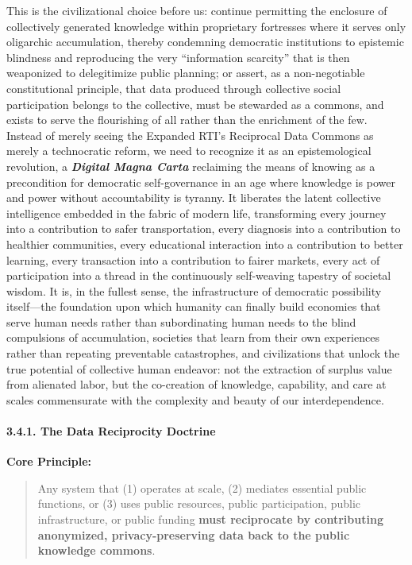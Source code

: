 This is the civilizational choice before us: continue permitting the
enclosure of collectively generated knowledge within proprietary
fortresses where it serves only oligarchic accumulation, thereby
condemning democratic institutions to epistemic blindness and
reproducing the very ``information scarcity'' that is then weaponized to
delegitimize public planning; or assert, as a non-negotiable
constitutional principle, that data produced through collective social
participation belongs to the collective, must be stewarded as a commons,
and exists to serve the flourishing of all rather than the enrichment of
the few. Instead of merely seeing the Expanded RTI's Reciprocal Data
Commons as merely a technocratic reform, we need to recognize it as an
epistemological revolution, a \textbf{\emph{Digital Magna Carta}}
reclaiming the means of knowing as a precondition for democratic
self-governance in an age where knowledge is power and power without
accountability is tyranny. It liberates the latent collective
intelligence embedded in the fabric of modern life, transforming every
journey into a contribution to safer transportation, every diagnosis
into a contribution to healthier communities, every educational
interaction into a contribution to better learning, every transaction
into a contribution to fairer markets, every act of participation into a
thread in the continuously self-weaving tapestry of societal wisdom. It
is, in the fullest sense, the infrastructure of democratic possibility
itself---the foundation upon which humanity can finally build economies
that serve human needs rather than subordinating human needs to the
blind compulsions of accumulation, societies that learn from their own
experiences rather than repeating preventable catastrophes, and
civilizations that unlock the true potential of collective human
endeavor: not the extraction of surplus value from alienated labor, but
the co-creation of knowledge, capability, and care at scales
commensurate with the complexity and beauty of our interdependence.

\paragraph{3.4.1. The Data Reciprocity
Doctrine}\label{the-data-reciprocity-doctrine}

\textbf{Core Principle:}

\begin{quote}
Any system that (1) operates at scale, (2) mediates essential public
functions, or (3) uses public resources, public participation, public
infrastructure, or public funding \textbf{must reciprocate by
contributing anonymized, privacy-preserving data back to the public
knowledge commons}.
\end{quote}

